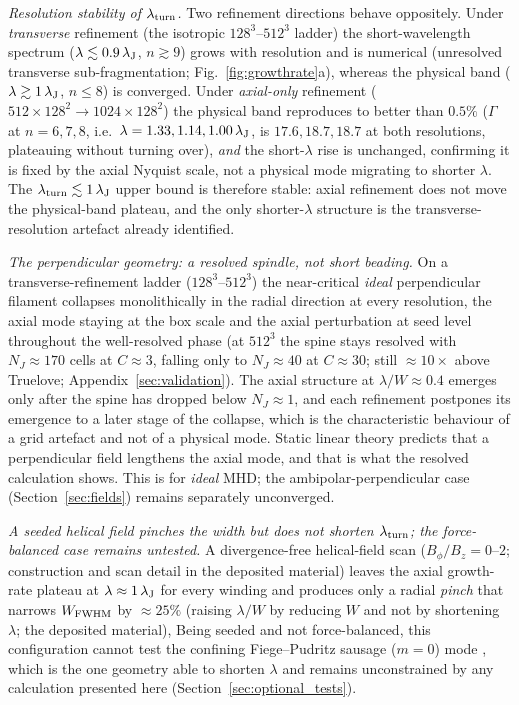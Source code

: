 \documentclass[usenatbib,twoside,twocolumn]{mnras}
\begin{document}
\emph{Resolution stability of $\lambda_{\rm turn}$.} Two refinement directions behave oppositely. Under \emph{transverse} refinement (the isotropic $128^3$--$512^3$ ladder) the short-wavelength spectrum ($\lambda\lesssim0.9\,\lambda_{\rm J}$, $n\gtrsim9$) grows with resolution and is numerical (unresolved transverse sub-fragmentation; Fig.~\ref{fig:growthrate}a), whereas the physical band ($\lambda\gtrsim1\,\lambda_{\rm J}$, $n\leq8$) is converged. Under \emph{axial-only} refinement ($512\times128^2\to1024\times128^2$) the physical band reproduces to better than $0.5\%$ ($\Gamma$ at $n=6,7,8$, i.e.\ $\lambda=1.33,1.14,1.00\,\lambda_{\rm J}$, is $17.6,18.7,18.7$ at both resolutions, plateauing without turning over), \emph{and} the short-$\lambda$ rise is unchanged, confirming it is fixed by the axial Nyquist scale, not a physical mode migrating to shorter $\lambda$. The $\lambda_{\rm turn}\lesssim1\,\lambda_{\rm J}$ upper bound is therefore stable: axial refinement does not move the physical-band plateau, and the only shorter-$\lambda$ structure is the transverse-resolution artefact already identified.

\emph{The perpendicular geometry: a resolved spindle, not short beading.} On a transverse-refinement ladder ($128^3$--$512^3$) the near-critical \emph{ideal} perpendicular filament collapses monolithically in the radial direction at every resolution, the axial mode staying at the box scale and the axial perturbation at seed level throughout the well-resolved phase (at $512^3$ the spine stays resolved with $N_J\approx170$ cells at $C\approx3$, falling only to $N_J\approx40$ at $C\approx30$; still $\approx10\times$ above Truelove; Appendix~\ref{sec:validation}). The axial structure at $\lambda/W\approx0.4$ emerges only after the spine has dropped below $N_J\approx1$, and each refinement postpones its emergence to a later stage of the collapse, which is the characteristic behaviour of a grid artefact and not of a physical mode. Static linear theory predicts that a perpendicular field lengthens the axial mode, and that is what the resolved calculation shows. This is for \emph{ideal} MHD; the ambipolar-perpendicular case (Section~\ref{sec:fields}) remains separately unconverged.

\emph{A seeded helical field pinches the width but does not shorten $\lambda_{\rm turn}$; the force-balanced case remains untested.} A divergence-free helical-field scan ($B_\phi/B_z=0$--$2$; construction and scan detail in the deposited material) leaves the axial growth-rate plateau at $\lambda\approx1\,\lambda_{\rm J}$ for every winding and produces only a radial \emph{pinch} that narrows $W_{\rm FWHM}$ by $\approx25\%$ (raising $\lambda/W$ by reducing $W$ and not by shortening $\lambda$; the deposited material), Being seeded and not force-balanced, this configuration cannot test the confining Fiege--Pudritz sausage ($m=0$) mode \citep{Fiege2000}, which is the one geometry able to shorten $\lambda$ and remains unconstrained by any calculation presented here (Section~\ref{sec:optional_tests}).
\end{document}
